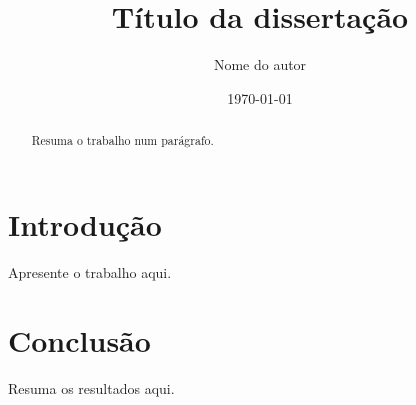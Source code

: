 \documentclass[12pt]{report}
\title{Título da dissertação}
\author{Nome do autor}
\date{\today}
\begin{document}
\maketitle

\begin{abstract}
Resuma o trabalho num parágrafo.
\end{abstract}

\tableofcontents

\chapter{Introdução}
Apresente o trabalho aqui.

\chapter{Conclusão}
Resuma os resultados aqui.
\end{document}
